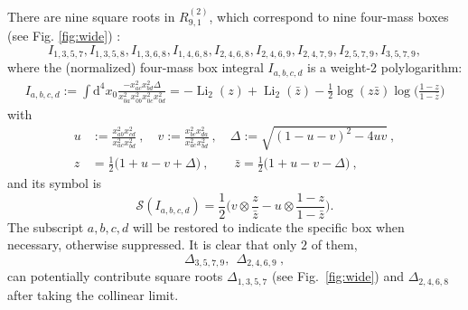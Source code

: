 \documentclass[a4paper,12pt]{article}
\newcommand{\dif}{\mathrm{d}} %
\DeclareMathOperator{\Li}{Li} %
\begin{document}
There are nine square roots in $R_{9,1}^{(2)}$, which correspond to nine four-mass boxes (see Fig. \ref{fig:wide}) :
\[
I_{1,3,5,7},I_{1,3,5,8},I_{1,3,6,8},I_{1,4,6,8},I_{2,4,6,8},I_{2,4,6,9},I_{2,4,7,9},I_{2,5,7,9},I_{3,5,7,9},
\]
where the (normalized) four-mass box integral $I_{a,b,c,d}$ is a weight-2 polylogarithm:
\begin{align}
    I_{a,b,c,d}:=\int \dif^{4} x_{0} \frac{-x_{ac}^{2}x_{bd}^{2}\Delta}{x_{0a}^{2}x_{0b}^{2}x_{0c}^{2}x_{0d}^{2}} =
    -\Li_{2}(z)+\Li_{2}(\bar{z})-\frac{1}{2}\log(z\bar{z}) \log\biggl(\frac{1-z}{1-\bar{z}}\biggr) \label{boxintegral}
\end{align}
with
\begin{align}
    u&:=\frac{x_{ab}^{2}x_{cd}^{2}}{x_{ac}^{2}x_{bd}^{2}}\:,\quad v:=\frac{x_{bc}^{2}x_{da}^{2}}{x_{ac}^{2}x_{bd}^{2}} \:,\quad  \Delta:=\sqrt{(1-u-v)^{2}-4uv} \:, \label{uvdel} \\
    z&=\frac{1}{2}\bigl(1+u-v+\Delta\bigr)\:, \qquad \bar{z}=\frac{1}{2}\bigl(1+u-v-\Delta\bigr)\:,\label{zzbar}
\end{align}
and its symbol is 
\[
    \mathcal S(I_{a,b,c,d})=\frac 12\biggl(v\otimes \frac{z}{\bar z}-u\otimes \frac{1-z}{1-\bar z}\biggr).
\]
The subscript $a,b,c,d$ will be restored to indicate the specific box when necessary, otherwise suppressed. It is clear that only $2$ of them, 
\[ 
   \Delta_{3,5,7,9},\:\:\Delta_{2,4,6,9}\:,
\]
can potentially contribute square roots $\Delta_{1,3,5,7}$ (see Fig.~\ref{fig:wide}) and  $\Delta_{2,4,6,8}$ after taking the collinear limit. 
\end{document}
